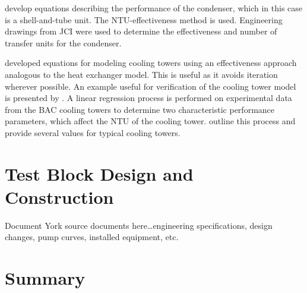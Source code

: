 \citet{incropera2007} develop equations describing the performance of the condenser, 
which in this case is a shell-and-tube unit. 
The NTU-effectiveness method is used. 
Engineering drawings from JCI were used to determine 
the effectiveness and number of transfer units for the condenser.

\citet{braun1989} developed equations for modeling cooling towers 
using an effectiveness approach analogous to the heat exchanger model.
This is useful as it avoids iteration wherever possible. 
An example useful for verification of the cooling tower model 
is presented by \citet{mitchell2013}. 
A linear regression process is performed on experimental data from 
the BAC cooling towers to determine two characteristic performance parameters, 
which affect the NTU of the cooling tower. 
\citet{braun1989} outline this process and provide several values 
for typical cooling towers. 

\section{Test Block Design and Construction}
Document York source documents here\dots engineering specifications, 
design changes, pump curves, installed equipment, etc.

\section{Summary}
